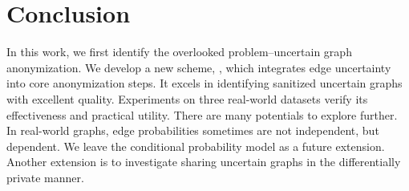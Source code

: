 \vspace{-3pt}
\section{Conclusion}
In this work, we first identify the overlooked problem–uncertain graph anonymization. 
We develop a new scheme, {\methodName}, which integrates edge uncertainty into core anonymization steps.  
It excels in identifying sanitized uncertain graphs with excellent quality. 
Experiments on three real-world datasets verify its effectiveness and practical utility.
There are many potentials to explore further.  
In real-world graphs, edge probabilities sometimes are not independent, but dependent.  
We leave the conditional probability model as a future extension. 
Another extension is to investigate sharing uncertain graphs in the differentially private manner.